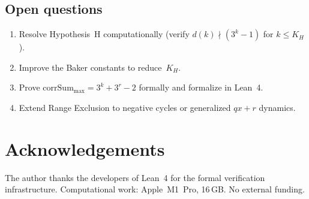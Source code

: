 \documentclass[11pt, a4paper]{amsart}
\theoremstyle{plain}
\theoremstyle{definition}
\theoremstyle{remark}
\newcommand{\corrSum}{\mathrm{corrSum}}
\begin{document}
\subsection{Open questions}\label{ssec:open}

\begin{enumerate}
  \item Resolve Hypothesis~H computationally
    (verify $d(k) \nmid (3^k-1)$ for $k \leq K_H$).
  \item Improve the Baker constants to reduce~$K_H$.
  \item Prove $\corrSum_{\max} = 3^k + 3^r - 2$ formally
    and formalize in Lean~4.
  \item Extend Range Exclusion to negative cycles or
    generalized $qx{+}r$ dynamics.
\end{enumerate}

\section*{Acknowledgements}

The author thanks the developers of Lean~4 for the formal
verification infrastructure.
Computational work: Apple~M1~Pro, 16\,GB.
No external funding.
\end{document}
